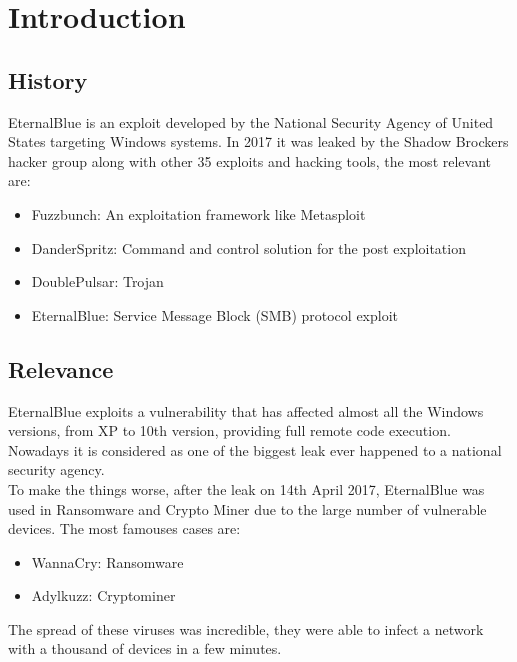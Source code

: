 \section{Introduction}
\subsection{History}
EternalBlue is an exploit developed by the National Security Agency of United States targeting Windows systems\cite{nsa-hacked}.
In 2017 it was leaked by the Shadow Brockers hacker group\cite{bbc-eternalblue} along with other 35 exploits and hacking
tools, the most relevant are:
\begin{itemize}
    \item Fuzzbunch: An exploitation framework like Metasploit
    \item DanderSpritz: Command and control solution for the post exploitation
    \item DoublePulsar: Trojan
    \item EternalBlue: Service Message Block (SMB) protocol exploit
\end{itemize}

\subsection{Relevance}
EternalBlue exploits a vulnerability that has affected almost all the Windows versions, from XP to 10th version, providing full remote code execution\cite{microsoft-bulletin}.
Nowadays it is considered as one of the biggest leak ever happened to a national security agency.\\
To make the things worse, after the leak on 14th April 2017, EternalBlue was used in Ransomware\cite{exploit-wannacryptor} and Crypto Miner due to the large number of vulnerable devices.
The most famouses cases are:
\begin{itemize}
    \item WannaCry: Ransomware
    \item Adylkuzz: Cryptominer
\end{itemize}
The spread of these viruses was incredible, they were able to infect a network with a thousand of devices in a few minutes.